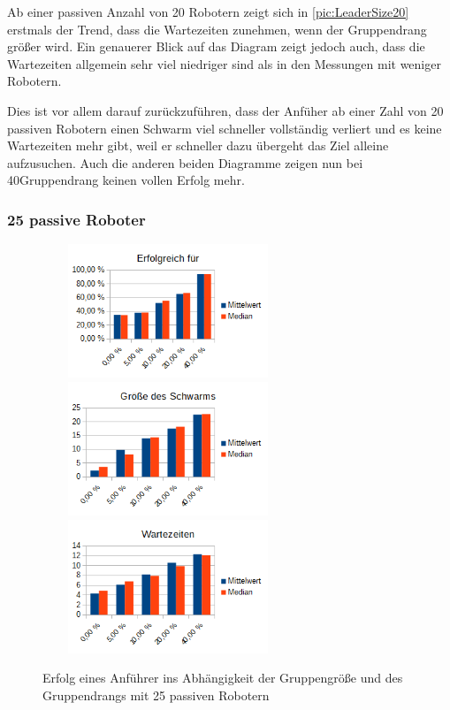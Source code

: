 Ab einer passiven Anzahl von 20 Robotern zeigt sich in \autoref{pic:LeaderSize20} erstmals der Trend, dass die Wartezeiten zunehmen, wenn der Gruppendrang größer wird. Ein genauerer Blick auf das Diagram zeigt jedoch auch, dass die Wartezeiten allgemein sehr viel niedriger sind als in den Messungen mit weniger Robotern.

Dies ist vor allem darauf zurückzuführen, dass der Anfüher ab einer Zahl von 20 passiven Robotern einen Schwarm viel schneller vollständig verliert und es keine Wartezeiten mehr gibt, weil er schneller dazu übergeht das Ziel alleine aufzusuchen. Auch die anderen beiden Diagramme zeigen nun bei 40\per Gruppendrang keinen vollen Erfolg mehr.

\subsubsection*{25 passive Roboter}

\begin{figure}[h]
	\includegraphics[width=7.5cm, height=4cm]{graphics/Statistics/Leader/FlockSize/25_1.png}
	\includegraphics[width=7.5cm, height=4cm]{graphics/Statistics/Leader/FlockSize/25_2.png}
	\includegraphics[width=7.5cm, height=4cm]{graphics/Statistics/Leader/FlockSize/25_3.png}
	\caption{Erfolg eines Anführer ins Abhängigkeit der Gruppengröße und des Gruppendrangs mit 25 passiven Robotern}
	\label{pic:LeaderSize25}
\end{figure}

